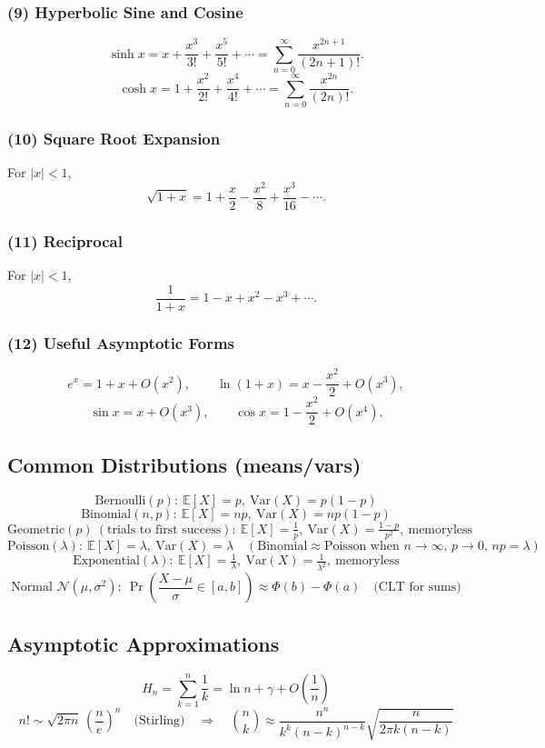 \documentclass[10pt]{article}
\theoremstyle{definition}
\begin{document}
\subsubsection*{(9) Hyperbolic Sine and Cosine}
\[
\sinh x = x + \frac{x^3}{3!} + \frac{x^5}{5!} + \cdots
= \sum_{n=0}^\infty \frac{x^{2n+1}}{(2n+1)!}.
\]
\[
\cosh x = 1 + \frac{x^2}{2!} + \frac{x^4}{4!} + \cdots
= \sum_{n=0}^\infty \frac{x^{2n}}{(2n)!}.
\]

\subsubsection*{(10) Square Root Expansion}
For \(|x|<1\),
\[
\sqrt{1+x}
    = 1 + \frac{x}{2} - \frac{x^2}{8} + \frac{x^3}{16} - \cdots.
\]

\subsubsection*{(11) Reciprocal}
For \(|x|<1\),
\[
\frac{1}{1+x}
    = 1 - x + x^2 - x^3 + \cdots.
\]

\subsubsection*{(12) Useful Asymptotic Forms}
\[
e^x = 1 + x + O(x^2), \qquad
\ln(1+x) = x - \frac{x^2}{2} + O(x^3),
\]
\[
\sin x = x + O(x^3), \qquad
\cos x = 1 - \frac{x^2}{2} + O(x^4).
\]

\subsection{Common Distributions (means/vars)}
\[
\text{Bernoulli}(p):\ \mathbb{E}[X]=p,\ \mathrm{Var}(X)=p(1-p)
\]
\[
\text{Binomial}(n,p):\ \mathbb{E}[X]=np,\ \mathrm{Var}(X)=np(1-p)
\]
\[
\text{Geometric}(p)\ (\text{trials to first success}):\ \mathbb{E}[X]=\tfrac{1}{p},\ \mathrm{Var}(X)=\tfrac{1-p}{p^2},\ \text{memoryless}
\]
\[
\text{Poisson}(\lambda):\ \mathbb{E}[X]=\lambda,\ \mathrm{Var}(X)=\lambda\quad(\text{Binomial}\approx\text{Poisson when }n\to\infty,\,p\to0,\,np=\lambda)
\]
\[
\text{Exponential}(\lambda):\ \mathbb{E}[X]=\tfrac{1}{\lambda},\ \mathrm{Var}(X)=\tfrac{1}{\lambda^2},\ \text{memoryless}
\]
\[
\text{Normal } \mathcal{N}(\mu,\sigma^2):\ \Pr\left(\frac{X-\mu}{\sigma}\in[a,b]\right)\approx \Phi(b)-\Phi(a)\quad\text{(CLT for sums)}
\]

\subsection{Asymptotic Approximations}
\[
H_n=\sum_{k=1}^n \frac{1}{k}=\ln n+\gamma+O\!\left(\frac{1}{n}\right)
\]
\[
n!\sim \sqrt{2\pi n}\,\left(\frac{n}{e}\right)^n\quad\text{(Stirling)}\quad\Rightarrow\quad \binom{n}{k}\approx \frac{n^n}{k^k(n-k)^{n-k}}\sqrt{\frac{n}{2\pi k(n-k)}}
\]
\end{document}
